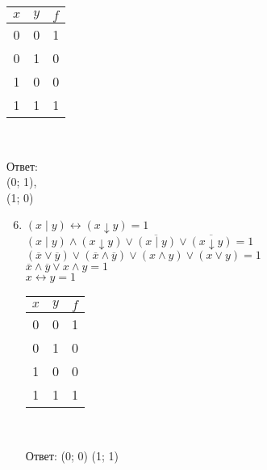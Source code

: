 \begin{spacing}{1.5}
\begin{minipage}[t]{0.2\textwidth}
\begin{enumerate}
\begin{spacing}{1}
\begin{tabular}{|c|c|c|}
                        $x$ & $y$ & $f$ \\
                        \hline
                        0   & 0   & 1   \\
                        \hline
                        0   & 1   & 0   \\
                        \hline
                        1   & 0   & 0   \\
                        \hline
                        1   & 1   & 1   \\
                        \hline
                    \end{tabular}\\
                \end{spacing}
                Ответ: \\(0; 1), \\(1; 0)
            \end{enumerate}
        \end{minipage}
        \begin{minipage}[t]{0.5\textwidth}
            \begin{enumerate}
                \setcounter{enumi}{5}
                \item $(x \mid y) \leftrightarrow (x \downarrow y) = 1$\\
                $(x \mid y) \wedge (x \downarrow y) \vee \overline{(x \mid y)} \vee \overline{(x \downarrow y)} = 1$\\
                $(\overline x \vee \overline y) \vee (\overline x \wedge \overline y) \vee (x \wedge y) \vee (x \vee y) = 1$\\
                $\overline x \wedge \overline y \vee x \wedge y = 1$\\
                $x \leftrightarrow y = 1$
                \begin{spacing}{1}
                    \begin{tabular}{|c|c|c|}
                        \hline
                        $x$ & $y$ & $f$ \\
                        \hline
                        0   & 0   & 1   \\
                        \hline
                        0   & 1   & 0   \\
                        \hline
                        1   & 0   & 0   \\
                        \hline
                        1   & 1   & 1   \\
                        \hline
                    \end{tabular}\\
                \end{spacing}
                Ответ: (0; 0) (1; 1)
            \end{enumerate}
        \end{minipage}


    \end{spacing}


